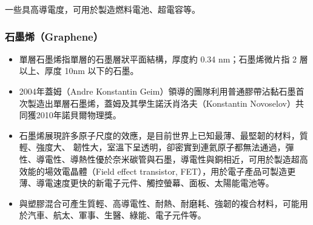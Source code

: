 \documentclass[a4paper,12pt]{report}
\begin{document}
\begin{itemize}
\begin{itemize}
\begin{itemize}
一些具高導電度，可用於製造燃料電池、超電容等。
\subsubsection{石墨烯（Graphene）}
\begin{itemize}
\item 單層石墨烯指單層的石墨層狀平面結構，厚度約 0.34 nm；石墨烯微片指 2 層以上、厚度 10nm 以下的石墨。
\item 2004年蓋姆（Andre Konstantin Geim）領導的團隊利用普通膠帶沾黏石墨首次製造出單層石墨烯，蓋姆及其學生諾沃肖洛夫（Konstantin Novoselov）共同獲2010年諾貝爾物理獎。
\item 石墨烯展現許多原子尺度的效應，是目前世界上已知最薄、最堅韌的材料，質輕、強度大、 韌性大，室溫下呈透明，卻密實到連氦原子都無法通過，彈性、導電性、導熱性優於奈米碳管與石墨，導電性與銅相近，可用於製造超高效能的場效電晶體（Field effect transistor, FET），用於電子產品可製造更薄、導電速度更快的新電子元件、觸控螢幕、面板、太陽能電池等。
\item 與塑膠混合可產生質輕、高導電性、耐熱、耐磨耗、強韌的複合材料，可能用於汽車、航太、軍事、生醫、綠能、電子元件等。
\end{itemize}

\end{itemize}
\end{itemize}
\end{itemize}
\end{document}

